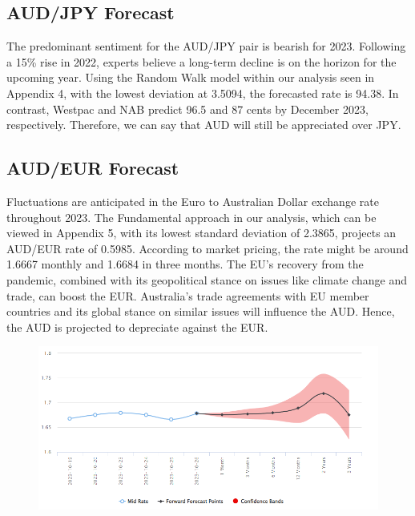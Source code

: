 \documentclass{article}
\let\Oldsubsection\subsection
\renewcommand{\subsection}{\FloatBarrier\Oldsubsection}
\begin{document}
\subsection*{AUD/JPY Forecast}

\noindent The predominant sentiment for the AUD/JPY pair is bearish for 2023. Following a 15\% rise in 2022, experts believe a long-term decline is on the horizon for the upcoming year. Using the Random Walk model within our analysis seen in Appendix 4, with the lowest deviation at 3.5094, the forecasted rate is 94.38. In contrast, Westpac and NAB predict 96.5 and 87 cents by December 2023, respectively. Therefore, we can say that AUD will still be appreciated over JPY.\\

\subsection*{AUD/EUR Forecast}

\noindent  Fluctuations are anticipated in the Euro to Australian Dollar exchange rate throughout 2023. The Fundamental approach in our analysis, which can be viewed in Appendix 5, with its lowest standard deviation of 2.3865, projects an AUD/EUR rate of 0.5985. According to market pricing, the rate might be around 1.6667 monthly and 1.6684 in three months. The EU's recovery from the pandemic, combined with its geopolitical stance on issues like climate change and trade, can boost the EUR. Australia's trade agreements with EU member countries and its global stance on similar issues will influence the AUD. Hence, the AUD is projected to depreciate against the EUR.\\

\begin{figure}[h!]
    \centering
    \includegraphics[scale=0.5]{graphs/AUDEUR.png}
\end{figure}
\end{document}

